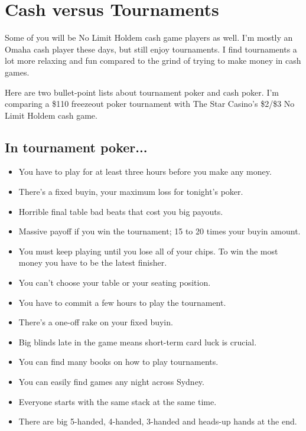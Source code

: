 \chapter{Cash versus Tournaments}


Some of you will be No Limit Holdem cash game players as well. I'm
mostly an Omaha cash player these days, but still enjoy tournaments. I
find tournaments a lot more relaxing and fun compared to the grind of
trying to make money in cash games.

Here are two bullet-point lists about tournament poker and cash
poker. I'm comparing a \$110 freezeout poker tournament with The Star
Casino's \$2/\$3 No Limit Holdem cash game.



\section{In tournament poker...}

\begin{itemize}
  \item You have to play for at least three hours before you make any money.
  \item There's a fixed buyin, your maximum loss for tonight's poker.
  \item Horrible final table bad beats that cost you big payouts.
  \item Massive payoff if you win the tournament; 15 to 20 times your
    buyin amount.
  \item You must keep playing until you lose all of your chips. To win
    the most money you have to be the latest finisher.
  \item You can't choose your table or your seating position.
  \item You have to commit a few hours to play the tournament.
  \item There's a one-off rake on your fixed buyin.
  \item Big blinds late in the game means short-term card luck is crucial.
  \item You can find many books on how to play tournaments.
  \item You can easily find games any night across Sydney.
  \item Everyone starts with the same stack at the same time.
  \item There are big 5-handed, 4-handed, 3-handed and heads-up hands
    at the end.
\end{itemize}

